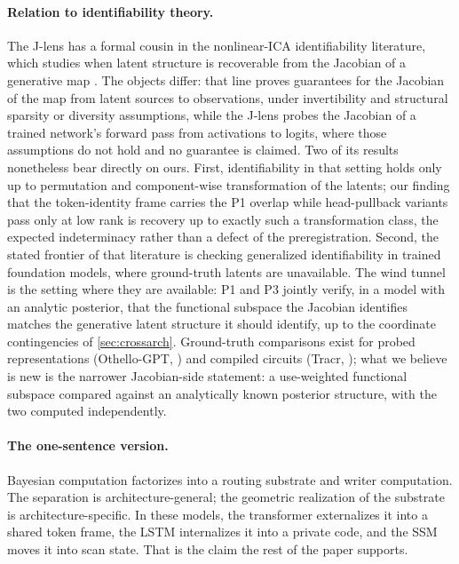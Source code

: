 \documentclass[11pt]{article}
\begin{document}
\paragraph{Relation to identifiability theory.}
The J-lens has a formal cousin in the nonlinear-ICA identifiability
literature, which studies when latent structure is recoverable from the
Jacobian of a generative map \citep{hyvarinen1999nonlinear,
zheng2022identifiability, zheng2023generalizing, dictdiverse2026}. The
objects differ: that line proves guarantees for the Jacobian of the map
from latent sources to observations, under invertibility and structural
sparsity or diversity assumptions, while the J-lens probes the Jacobian
of a trained network's forward pass from activations to logits, where
those assumptions do not hold and no guarantee is claimed. Two of its
results nonetheless bear directly on ours. First, identifiability in
that setting holds only up to permutation and component-wise
transformation of the latents; our finding that the token-identity
frame carries the P1 overlap while head-pullback variants pass only at
low rank is recovery up to exactly such a transformation class, the
expected indeterminacy rather than a defect of the preregistration.
Second, the stated frontier of that literature is checking generalized
identifiability in trained foundation models, where ground-truth
latents are unavailable. The wind tunnel is the setting where they are
available: P1 and P3 jointly verify, in a model with an analytic
posterior, that the functional subspace the Jacobian identifies matches
the generative latent structure it should identify, up to the
coordinate contingencies of \cref{sec:crossarch}. Ground-truth
comparisons exist for probed representations (Othello-GPT,
\citealt{li2023othello}) and compiled circuits
(Tracr, \citealt{lindner2023tracr}); what we believe is new is the
narrower Jacobian-side statement: a use-weighted functional subspace
compared against an analytically known posterior structure, with the
two computed independently.

\paragraph{The one-sentence version.} Bayesian computation factorizes
into a routing substrate and writer computation. The separation is
architecture-general; the geometric realization of the substrate is
architecture-specific. In these models, the transformer externalizes it
into a shared token frame, the LSTM internalizes it into a private
code, and the SSM moves it into scan state. That is the claim the rest
of the paper supports.
\end{document}
